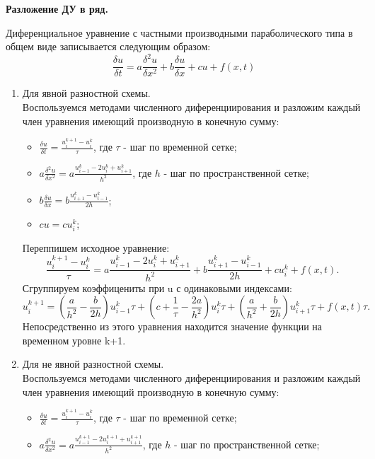 \documentclass[12pt]{article}
\begin{document}
    \pagestyle{fancy} 
        \fancyhead{}
    \fancyfoot{}

    \begin{center}  \textbf{Разложение ДУ в ряд.} \end{center}
    Диференциальное уравнение с частными производными параболического типа в общем виде записывается следующим образом: 
    $$\frac{\delta u}{\delta t} =a\frac{\delta^2 u}{\delta x^2}+b\frac{\delta u}{\delta x}+cu+f(x,t)$$
    \begin{enumerate}
    \item Для явной разностной схемы.
        \\Воспользуемся методами численного диференциирования и разложим каждый член уравнения имеющий производную в конечную сумму:
        \begin{itemize}
            \item $\frac{\delta u}{\delta t}=\frac{u_i^{k+1}-u_i^{k}}{\tau}$, где  $\tau$ - шаг по временной сетке;
            \item $a\frac{\delta^2 u}{\delta x^2} = a\frac{u_{i-1}^k-2u_{i}^k+u_{i+1}^k}{h^2}$, где  $h$ - шаг по пространственной сетке;
            \item $b\frac{\delta u}{\delta x} = b\frac{u_{i+1}^k-u_{i-1}^k}{2h}$;
            \item $cu = cu_{i}^k$;
        \end{itemize}
        Переппишем исходное уравнение:
        $$\frac{u_i^{k+1}-u_i^{k}}{\tau} =a\frac{u_{i-1}^k-2u_{i}^k+u_{i+1}^k}{h^2}+b\frac{u_{i+1}^k-u_{i-1}^k}{2h}+cu_{i}^k+f(x,t).$$
        Сгруппируем коэффицениты при u с одинаковыми индексами:
        $$u_i^{k+1} = \left(\frac{a}{h^2}-\frac{b}{2h} \right)u_{i-1}^k\tau + \left(c+\frac{1}{\tau}-\frac{2a}{h^2}\right)u_i^k\tau +
        \left(\frac{a}{h^2}+\frac{b}{2h}\right)u_{i+1}^k\tau+f(x,t)\tau.$$
        Непосредственно из этого уравнения находится значение функции на временном уровне k+1.
    \item Для не явной разностной схемы.
        \\Воспользуемся методами численного диференциирования и разложим каждый член уравнения имеющий производную в конечную сумму:
        \begin{itemize}
            \item $\frac{\delta u}{\delta t}=\frac{u_i^{k+1}-u_i^{k}}{\tau}$, где  $\tau$ - шаг по временной сетке;
            \item $a\frac{\delta^2 u}{\delta x^2} = a\frac{u_{i-1}^{k+1}-2u_{i}^{k+1}+u_{i+1}^{k+1}}{h^2}$, где  $h$ - шаг по пространственной сетке;

\end{itemize}
\end{enumerate}
\end{document}
